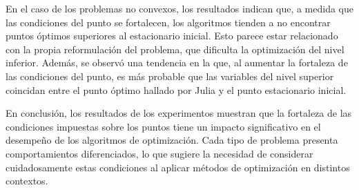 En el caso de los problemas no convexos, los resultados indican que, a medida que las condiciones del punto se fortalecen, 
los algoritmos tienden a no encontrar puntos óptimos superiores al estacionario inicial. 
Esto parece estar relacionado con la propia reformulación del problema, 
que dificulta la optimización del nivel inferior. 
Además, se observó una tendencia en la que, al aumentar la fortaleza de las condiciones del punto, 
es más probable que las variables del nivel superior coincidan entre el punto óptimo hallado por Julia y 
el punto estacionario inicial.  

En conclusión, los resultados de los experimentos muestran que la fortaleza de las condiciones impuestas 
sobre los puntos tiene un impacto significativo en el desempeño de los algoritmos de optimización. 
Cada tipo de problema presenta comportamientos diferenciados, lo que sugiere la necesidad de considerar 
cuidadosamente estas condiciones al aplicar métodos de optimización en distintos contextos.
